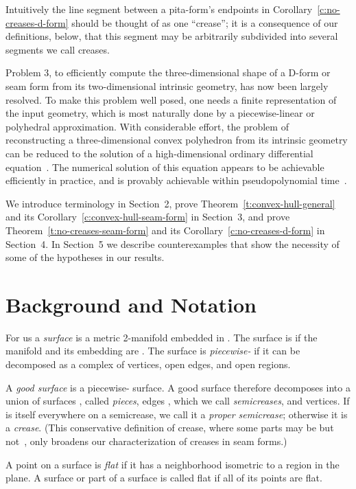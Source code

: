 \documentclass{article}
\newcommand\term[1]{{\it #1}}
\begin{document}
Intuitively the line segment between a pita-form's endpoints in
Corollary~\ref{c:no-creases-d-form} should be thought of as one
``crease''; it is a consequence of our definitions, below, that this
segment may be arbitrarily subdivided into several segments we call
creases.

Problem 3, to efficiently compute the three-dimensional shape of a
D-form or seam form from its two-dimensional intrinsic geometry, has
now been largely resolved.  To make this problem well posed, one needs
a finite representation of the input geometry, which is most naturally
done by a piecewise-linear or polyhedral approximation.  
With considerable effort, the
problem of reconstructing a three-dimensional convex polyhedron from
its intrinsic geometry can be
reduced to the solution of a high-dimensional ordinary differential
equation~\cite{BI}.  The numerical solution of this equation appears
to be achievable efficiently in practice, and is provably achievable
within pseudopolynomial time~\cite{KPD}.

We introduce terminology in Section~2, prove
Theorem~\ref{t:convex-hull-general} and its
Corollary~\ref{c:convex-hull-seam-form} in Section~3, and prove
Theorem~\ref{t:no-creases-seam-form} and its
Corollary~\ref{c:no-creases-d-form} in Section~4.  In Section~5 we
describe counterexamples that show the necessity of some of the
hypotheses in our results.



\section{Background and Notation} \label{sec:background}

For us a \term{surface} is a metric 2-manifold embedded in .  The
surface is  if the manifold and its embedding are .  The
surface is \term{piecewise-} if it can be decomposed as a complex
of vertices,  open edges, and  open regions.

A \term{good surface} is a piecewise- surface.  A good surface
 therefore decomposes into a union of  surfaces , called
\term{pieces},  edges , which we call
\term{semicreases}, and vertices.  If  is itself  everywhere on a
semicrease, we call it a \term{proper semicrease}; otherwise it is a
\term{crease}.  (This conservative definition of crease,
where some parts may be  but not~,
only broadens our characterization of creases in seam forms.)

A point on a surface is \term{flat} if it has a neighborhood isometric
to a region in the plane.  A surface or part of a surface is called
flat if all of its points are flat.
\end{document}
